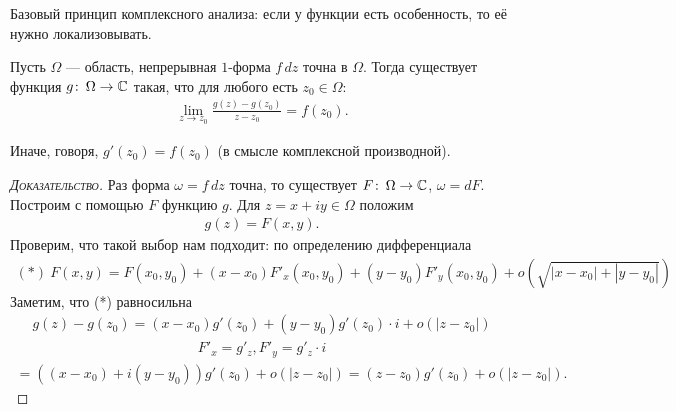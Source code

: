\documentclass[../../main.tex]{subfiles}
\begin{document}
Базовый принцип комплексного анализа: если у функции есть особенность, то её нужно локализовывать.

\begin{lm}
 Пусть $\Omega$ --- область, непрерывная $1$-форма $f\,dz$ точна в $\Omega$. Тогда существует функция $g \colon\,\Omega\to\mathbb{C}$ такая, что для любого есть $z_0 \in \Omega$:
 \begin{align*}
  \lim_{z \to z_0} \frac{g(z)-g(z_0)}{z-z_0} = f(z_0)
 .\end{align*} 

 Иначе, говоря, $g'(z_0) = f(z_0)$ (в смысле комплексной производной).
\end{lm}
\begin{proof}[\normalfont\textsc{Доказательство}]
 Раз форма $\omega = f\, dz$ точна, то существует $F \colon\, \Omega \to \mathbb{C} $, $\omega = dF$. Построим с помощью $F$ функцию $g$. Для $z = x+iy \in \Omega$ положим
 \begin{align*}
  g(z) = F(x,y).
 \end{align*} Проверим, что такой выбор нам подходит: по определению дифференциала
 \begin{align}
	 (*) \ F(x,y) = F(x_0, y_0) + (x-x_0) F'_x(x_0, y_0) + (y-y_0)F'_y(x_0,y_0) + o(\sqrt{\left| x-x_0 \right| + \left| y-y_0 \right|})
 \end{align} Заметим, что (*) равносильна
 \begin{align*}
  g(z) - g(z_0) = (x-x_0)g'(z_0) + (y-y_0)g'(z_0) \cdot i + o(\left| z-z_0 \right|)
 \end{align*} 
 \begin{align*}
  F'_x = g'_z, F'_y = g'_z \cdot i
 \end{align*} 
 \begin{align*}
  = ((x-x_0) + i(y-y_0))g'(z_0) + o(\left| z-z_0 \right|) = (z-z_0)g'(z_0) + o(\left| z-z_0 \right|).
 \end{align*} 
\end{proof}
\end{document}
